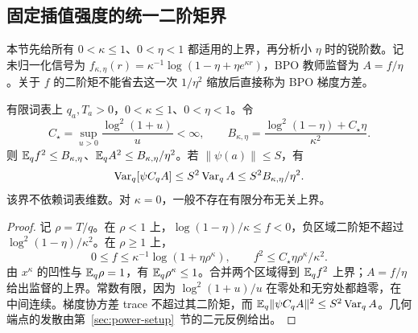 \subsection{固定插值强度的统一二阶矩界}

本节先给所有 $0<\kappa\le1$、$0<\eta<1$ 都适用的上界，再分析小 $\eta$ 时的锐阶数。记未归一化信号为 $f_{\kappa,\eta}(r)=\kappa^{-1}\log(1-\eta+\eta e^{\kappa r})$，BPO 教师监督为 $A=f/\eta$。关于 $f$ 的二阶矩不能省去这一次 $1/\eta^2$ 缩放后直接称为 BPO 梯度方差。

\begin{theorem}[幂均值信号的统一二阶矩界]
\label{thm:proximal-power-variance}
有限词表上 $q_a,T_a>0$，$0<\kappa\le1$、$0<\eta<1$。令
\begin{equation}
 C_\star=\sup_{u>0}\frac{\log^2(1+u)}u<\infty,\qquad
 B_{\kappa,\eta}=\frac{\log^2(1-\eta)+C_\star\eta}{\kappa^2}.
\end{equation}
则 $\mathbb E_qf^2\le B_{\kappa,\eta}$、$\mathbb E_qA^2\le B_{\kappa,\eta}/\eta^2$。若 $\|\psi(a)\|\le S$，有
\begin{equation}
 \operatorname{Var}_q[\psi C_qA]\le S^2\operatorname{Var}_qA
 \le S^2B_{\kappa,\eta}/\eta^2.
\end{equation}
该界不依赖词表维数。对 $\kappa=0$，一般不存在有限分布无关上界。
\end{theorem}

\begin{proof}
记 $\rho=T/q$。在 $\rho<1$ 上，$\log(1-\eta)/\kappa\le f<0$，负区域二阶矩不超过 $\log^2(1-\eta)/\kappa^2$。在 $\rho\ge1$ 上，
\begin{equation}
 0\le f\le\kappa^{-1}\log(1+\eta\rho^\kappa),\qquad
 f^2\le C_\star\eta\rho^\kappa/\kappa^2.
\end{equation}
由 $x^\kappa$ 的凹性与 $\mathbb E_q\rho=1$，有 $\mathbb E_q\rho^\kappa\le1$。合并两个区域得到 $\mathbb E_qf^2$ 上界；$A=f/\eta$ 给出监督的上界。常数有限，因为 $\log^2(1+u)/u$ 在零处和无穷处都趋零，在中间连续。梯度协方差 trace 不超过其二阶矩，而 $\mathbb E_q\|\psi C_qA\|^2\le S^2\operatorname{Var}_qA$。几何端点的发散由第~\ref{sec:power-setup}~节的二元反例给出。
\end{proof}
